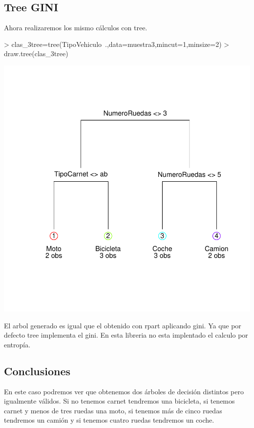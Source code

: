 \documentclass [a4paper] {article}
\begin{document}
\subsection{Tree GINI}
Ahora realizaremos los mismo cálculos con tree.
\begin{center}
\begin{Schunk}
\begin{Sinput}
> clas_3tree=tree(TipoVehiculo~.,data=muestra3,mincut=1,minsize=2) 
> draw.tree(clas_3tree)
\end{Sinput}
\end{Schunk}
\includegraphics{entrega-tree3}
\end{center}

El arbol generado es igual que el obtenido con rpart aplicando gini.
Ya que por defecto tree implementa el gini.
En esta libreria no esta implentado el calculo por entropía.

\subsection{Conclusiones}
En este caso podremos ver que obtenemos dos árboles de decisión distintos pero igualmente válidos.
Si no tenemos carnet tendremos una bicicleta,
si tenemos carnet y menos de tres ruedas una moto,
si tenemos más de cinco ruedas tendremos un camión y
si tenemos cuatro ruedas tendremos un coche.
\end{document}
